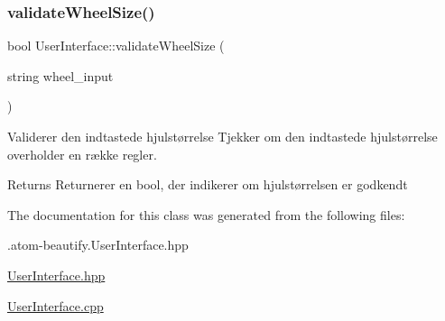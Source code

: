 \subsubsection{\texorpdfstring{validate\+Wheel\+Size()}{validateWheelSize()}}
{\footnotesize\ttfamily bool User\+Interface\+::validate\+Wheel\+Size (\begin{DoxyParamCaption}\item[{string}]{wheel\+\_\+input }\end{DoxyParamCaption})}



Validerer den indtastede hjulstørrelse Tjekker om den indtastede hjulstørrelse overholder en række regler. 

\begin{DoxyReturn}{Returns}
Returnerer en bool, der indikerer om hjulstørrelsen er godkendt 
\end{DoxyReturn}


The documentation for this class was generated from the following files\+:\begin{DoxyCompactItemize}
\item 
.\+atom-\/beautify.\+User\+Interface.\+hpp\item 
\hyperlink{UserInterface_8hpp}{User\+Interface.\+hpp}\item 
\hyperlink{UserInterface_8cpp}{User\+Interface.\+cpp}\end{DoxyCompactItemize}
